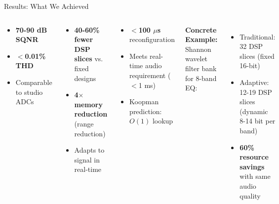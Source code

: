 \documentclass[aspectratio=169,11pt]{beamer}
\begin{document}
\begin{frame}{Results: What We Achieved}

\begin{columns}[T]

\begin{tcolorbox}[colback=green!15,colframe=green!70,title=\textbf{Signal Quality}]
\begin{itemize}
    \item \textbf{70-90 dB SQNR}
    \item \textbf{$<$0.01\% THD}
    \item Comparable to studio ADCs
\end{itemize}
\end{tcolorbox}

\vspace{0.3cm}

\begin{tcolorbox}[colback=lightblue!15,colframe=lightblue!70,title=\textbf{Resource Efficiency}]
\begin{itemize}
    \item \textbf{40-60\% fewer DSP slices} vs. fixed designs
    \item \textbf{4$\times$ memory reduction} (range reduction)
    \item Adapts to signal in real-time
\end{itemize}
\end{tcolorbox}


\begin{tcolorbox}[colback=orange!15,colframe=orange!70,title=\textbf{Latency}]
\begin{itemize}
    \item \textbf{$<$100 $\mu$s} reconfiguration
    \item Meets real-time audio requirement ($<$1 ms)
    \item Koopman prediction: $O(1)$ lookup
\end{itemize}
\end{tcolorbox}

\vspace{0.3cm}

\textbf{Concrete Example:}\\
Shannon wavelet filter bank for 8-band EQ:
\begin{itemize}
    \item Traditional: 32 DSP slices (fixed 16-bit)
    \item Adaptive: 12-19 DSP slices (dynamic 8-14 bit per band)
    \item \textbf{60\% resource savings} with same audio quality
\end{itemize}

\end{columns}

\end{frame}
\end{document}
